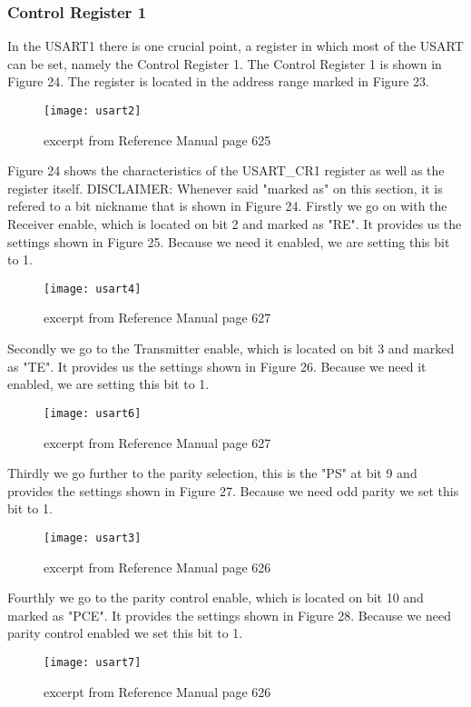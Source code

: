 \documentclass[11pt]{scrartcl}
\begin{document}
	\subsubsection{Control Register 1}
In the USART1 there is one crucial point, a register in which most of the USART can be set, namely the Control Register 1. The Control Register 1 is shown in Figure 24. The register is located in the address range marked in Figure 23. 
\begin{figure}[h]
		\centering
		\texttt{[image: usart2]}
		\caption{excerpt from Reference Manual page 625}
\end{figure}
\newline
Figure 24 shows the characteristics of the USART\_CR1 register as well as the register itself. DISCLAIMER: Whenever said "marked as" on this section, it is refered to a bit nickname that is shown in Figure 24.
\newline\newline
Firstly we go on with the Receiver enable, which is located on bit 2 and marked as "RE". It provides us the settings shown in Figure 25. Because we need it enabled, we are setting this bit to 1.
\begin{figure}[h]
		\centering
		\texttt{[image: usart4]}
		\caption{excerpt from Reference Manual page 627}
\end{figure}
\newpage
Secondly we go to the Transmitter enable, which is located on bit 3 and marked as "TE". It provides us the settings shown in Figure 26. Because we need it enabled, we are setting this bit to 1.
\begin{figure}[h]
		\centering
		\texttt{[image: usart6]}
		\caption{excerpt from Reference Manual page 627}
\end{figure}
\newline
Thirdly we go further to the parity selection, this is the "PS" at bit 9 and provides the settings shown in Figure 27. Because we need odd parity we set this bit to 1.
\begin{figure}[h]
		\centering
		\texttt{[image: usart3]}
		\caption{excerpt from Reference Manual page 626}
\end{figure}
\newline
Fourthly we go to the parity control enable, which is located on bit 10 and marked as "PCE". It provides the settings shown in Figure 28. Because we need parity control enabled we set this bit to 1.
\begin{figure}[h]
		\centering
		\texttt{[image: usart7]}
		\caption{excerpt from Reference Manual page 626}
\end{figure}
\end{document}
